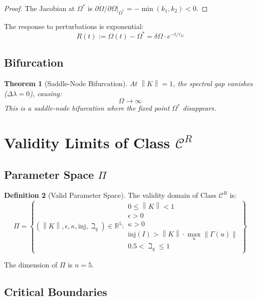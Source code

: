 \documentclass[11pt,a4paper]{article}
\theoremstyle{plain}
\newtheorem{theorem}{Theorem}[section]
\theoremstyle{definition}
\newtheorem{definition}[theorem]{Definition}
\newcommand{\norm}[1]{\left\lVert #1 \right\rVert}
\begin{document}
\begin{proof}
The Jacobian at $\Omega^*$ is $\partial \dot\Omega / \partial \Omega |_{\Omega^*} = -\min(k_1, k_2) < 0$.
\end{proof}

The response to perturbations is exponential:
\[
R(t) := \Omega(t) - \Omega^* = \delta\Omega \cdot e^{-t/\tau_\Omega}
\]

\subsection{Bifurcation}

\begin{theorem}[Saddle-Node Bifurcation]
At $\norm{K} = 1$, the spectral gap vanishes ($\Delta\lambda = 0$), causing:
\[
\Omega \to \infty
\]
This is a saddle-node bifurcation where the fixed point $\Omega^*$ disappears.
\end{theorem}

\section{Validity Limits of Class $\mathscr{C}^R$}

\subsection{Parameter Space $\Pi$}

\begin{definition}[Valid Parameter Space]
The validity domain of Class $\mathscr{C}^R$ is:
\[
\Pi = \left\{ (\norm{K}, \epsilon, \kappa, \text{inj}, \beth_q) \in \mathbb{R}^5 : 
\begin{array}{l}
0 \leq \norm{K} < 1 \\
\epsilon > 0 \\
\kappa > 0 \\
\text{inj}(I) > \norm{K} \cdot \max_u \norm{\Gamma(u)} \\
0.5 < \beth_q \leq 1
\end{array}
\right\}
\]
\end{definition}

The dimension of $\Pi$ is $n = 5$.

\subsection{Critical Boundaries}
\end{document}
